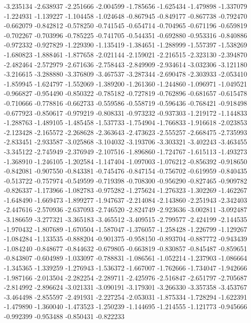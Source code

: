 -3.235134
-2.638937
-2.251666
-2.004599
-1.785656
-1.625434
-1.479898
-1.337079
-1.224931
-1.139227
-1.104458
-1.024648
-0.867945
-0.849177
-0.867738
-0.792470
-0.662079
-0.842812
-0.578250
-0.741545
-0.654714
-0.704965
-0.671196
-0.659819
-0.702267
-0.703996
-0.785225
-0.741705
-0.544351
-0.692880
-0.953316
-0.840886
-0.972332
-0.927829
-1.229390
-1.135419
-1.384651
-1.288999
-1.557397
-1.538269
-1.680823
-1.888461
-1.877658
-2.021144
-2.159021
-2.216515
-2.323130
-2.394870
-2.482464
-2.572979
-2.671636
-2.758443
-2.849909
-2.934614
-3.032306
-3.121180
-3.216615
-3.288880
-3.376809
-3.467537
-3.287344
-2.690478
-2.303933
-2.053410
-1.859945
-1.624797
-1.552069
-1.389200
-1.261360
-1.244860
-1.096971
-1.049521
-0.966827
-0.954490
-0.850322
-0.785182
-0.727819
-0.762896
-0.681657
-0.615478
-0.710666
-0.778816
-0.662733
-0.559586
-0.558719
-0.596436
-0.768421
-0.918498
-0.677923
-0.850617
-0.979219
-0.808331
-0.973232
-0.937303
-1.219172
-1.144833
-1.288763
-1.489105
-1.485458
-1.537733
-1.754904
-1.766833
-1.916618
-2.023853
-2.123428
-2.165572
-2.268628
-2.363643
-2.473623
-2.555257
-2.668475
-2.735993
-2.833451
-2.933587
-3.025868
-3.104032
-3.193706
-3.303321
-3.402243
-3.463455
-3.345122
-2.745949
-2.376949
-2.107516
-1.896860
-1.724767
-1.615113
-1.493273
-1.368910
-1.246105
-1.202584
-1.147404
-1.097003
-1.076212
-0.856392
-0.918650
-0.842081
-0.907550
-0.843381
-0.745476
-0.847154
-0.756702
-0.619959
-0.840435
-0.513722
-0.757974
-0.549599
-0.719398
-0.708300
-0.956290
-0.827465
-0.909782
-0.826337
-1.173966
-1.082783
-0.975282
-1.275624
-1.276323
-1.302269
-1.462267
-1.648490
-1.669473
-1.899277
-1.947637
-2.214084
-2.143860
-2.251943
-2.342403
-2.447616
-2.570936
-2.637093
-2.746520
-2.824749
-2.923636
-3.002811
-3.092487
-3.186659
-3.277321
-3.365183
-3.465512
-3.409515
-2.799577
-2.424199
-2.144535
-1.970432
-1.807689
-1.670504
-1.587047
-1.376057
-1.258428
-1.226799
-1.129267
-1.084284
-1.133535
-0.888204
-0.901375
-0.958150
-0.893704
-0.887772
-0.943439
-1.084240
-0.848677
-0.844632
-0.679805
-0.663819
-0.830857
-0.845487
-0.859651
-0.843807
-0.604989
-1.033097
-0.788831
-1.086561
-1.052214
-1.237903
-1.086664
-1.345365
-1.339259
-1.276943
-1.536372
-1.667007
-1.762666
-1.734047
-1.942666
-1.987166
-2.013504
-2.282254
-2.289711
-2.425976
-2.516847
-2.651797
-2.705687
-2.814992
-2.896624
-3.021331
-3.090191
-3.179301
-3.266330
-3.357358
-3.453767
-3.464498
-2.855597
-2.491931
-2.227254
-2.053031
-1.875334
-1.728294
-1.622391
-1.479890
-1.360040
-1.473523
-1.250239
-1.144695
-1.214555
-1.121773
-0.945666
-0.992399
-0.953488
-0.850431
-0.822233
